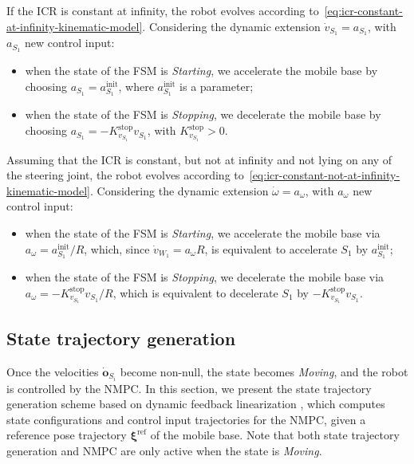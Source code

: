 If the ICR is constant at infinity, the robot evolves according
to~\eqref{eq:icr-constant-at-infinity-kinematic-model}.
Considering the dynamic extension $\dot{v}_{S_1}=a_{S_1}$, with $a_{S_1}$ new control input:
\begin{itemize}
    \item when the state of the FSM is \textit{Starting},
        we accelerate the mobile base by choosing
        $a_{S_1} = a_{S_1}^{\mathrm{init}}$, where $a_{S_1}^{\mathrm{init}}$
        is a parameter;
    \item when the state of the FSM is \textit{Stopping}, we decelerate the
        mobile base by choosing $a_{S_1} = -K_{v_{S_1}}^{\mathrm{stop}} v_{S_1}$,
        with $K_{v_{S_1}}^{\mathrm{stop}} > 0$.
\end{itemize}

Assuming that the ICR is constant, but not at infinity and not lying on any of
the steering joint, the robot evolves according to~\eqref{eq:icr-constant-not-at-infinity-kinematic-model}.
Considering the dynamic extension $\dot{\omega}=a_{\omega}$, with
$a_{\omega}$ new control input:
\begin{itemize}
    \item when the state of the FSM is \textit{Starting}, we accelerate the
        mobile base via $a_{\omega} = a_{S_1}^{\mathrm{init}} / R$, which,
        since $\dot{v}_{W_1}=a_{\omega} R$, is equivalent to accelerate $S_1$ by $a_{S_1}^{\mathrm{init}}$;
    \item when the state of the FSM is \textit{Stopping}, we decelerate the
        mobile base via $a_{\omega} = -K_{v_{S_1}}^{\mathrm{stop}} v_{S_1} / R$,
        which is equivalent to decelerate $S_1$ by $-K_{v_{S_1}}^{\mathrm{stop}} v_{S_1}$.
\end{itemize}

\subsection{State trajectory generation}
Once the velocities $\dot{\bm{o}}_{S_i}$ become non-null, the state becomes
\textit{Moving}, and the robot is controlled by the NMPC. In this section, we
present the state trajectory generation scheme based on dynamic feedback
linearization \cite{Oriolo2002WMRControlDFL}, which computes state
configurations and control input trajectories for the NMPC, given a reference
pose trajectory $\bm{\xi}^{\mathrm{ref}}$ of the mobile base. Note that both
state trajectory generation and NMPC are only active when the state is
\textit{Moving}.

